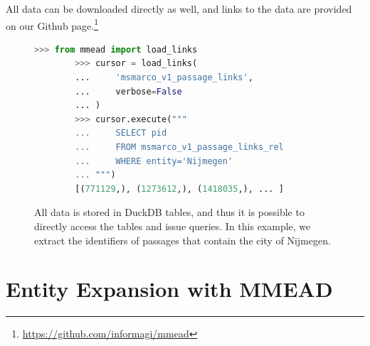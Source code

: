 All data can be downloaded directly as well, and links to the data are provided on our Github page.\footnote{\url{https://github.com/informagi/mmead}}

\begin{figure}[!t]
	\begin{lstlisting}[language=python]
		>>> from mmead import load_links
		>>> cursor = load_links(
		...     'msmarco_v1_passage_links',
		...     verbose=False
		... )
		>>> cursor.execute("""
		...     SELECT pid 
		...     FROM msmarco_v1_passage_links_rel 
		...     WHERE entity='Nijmegen'
		... """)
		[(771129,), (1273612,), (1418035,), ... ]
	\end{lstlisting}
	\caption{All data is stored in DuckDB tables, and thus it is possible to directly access the tables and issue queries. In this example, we extract the identifiers of passages that contain the city of Nijmegen.}
	\label{fig:sql_engine}
\end{figure}

\section{Entity Expansion with MMEAD}

